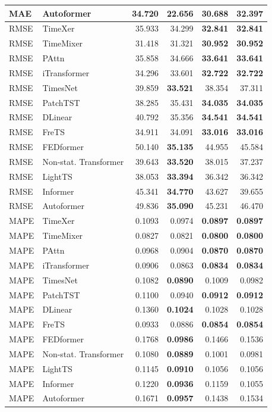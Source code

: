 \begin{longtable}{llrrrr}
MAE & Autoformer & 34.720 & \textbf{22.656} & 30.688 & 32.397 \\
\midrule
RMSE & TimeXer & 35.933 & 34.299 & \textbf{32.841} & \textbf{32.841} \\
RMSE & TimeMixer & 31.418 & 31.321 & \textbf{30.952} & \textbf{30.952} \\
RMSE & PAttn & 35.858 & 34.666 & \textbf{33.641} & \textbf{33.641} \\
RMSE & iTransformer & 34.296 & 33.601 & \textbf{32.722} & \textbf{32.722} \\
RMSE & TimesNet & 39.859 & \textbf{33.521} & 38.354 & 37.311 \\
RMSE & PatchTST & 38.285 & 35.431 & \textbf{34.035} & \textbf{34.035} \\
RMSE & DLinear & 40.792 & 35.356 & \textbf{34.541} & \textbf{34.541} \\
RMSE & FreTS & 34.911 & 34.091 & \textbf{33.016} & \textbf{33.016} \\
RMSE & FEDformer & 50.140 & \textbf{35.135} & 44.955 & 45.584 \\
RMSE & Non-stat. Transformer & 39.643 & \textbf{33.520} & 38.015 & 37.237 \\
RMSE & LightTS & 38.053 & \textbf{33.394} & 36.342 & 36.342 \\
RMSE & Informer & 45.341 & \textbf{34.770} & 43.627 & 39.655 \\
RMSE & Autoformer & 49.836 & \textbf{35.090} & 45.231 & 46.470 \\
\midrule
MAPE & TimeXer & 0.1093 & 0.0974 & \textbf{0.0897} & \textbf{0.0897} \\
MAPE & TimeMixer & 0.0827 & 0.0821 & \textbf{0.0800} & \textbf{0.0800} \\
MAPE & PAttn & 0.0968 & 0.0904 & \textbf{0.0870} & \textbf{0.0870} \\
MAPE & iTransformer & 0.0906 & 0.0863 & \textbf{0.0834} & \textbf{0.0834} \\
MAPE & TimesNet & 0.1082 & \textbf{0.0890} & 0.1009 & 0.0982 \\
MAPE & PatchTST & 0.1100 & 0.0940 & \textbf{0.0912} & \textbf{0.0912} \\
MAPE & DLinear & 0.1360 & \textbf{0.1024} & 0.1028 & 0.1028 \\
MAPE & FreTS & 0.0933 & 0.0886 & \textbf{0.0854} & \textbf{0.0854} \\
MAPE & FEDformer & 0.1768 & \textbf{0.0986} & 0.1466 & 0.1536 \\
MAPE & Non-stat. Transformer & 0.1080 & \textbf{0.0889} & 0.1001 & 0.0981 \\
MAPE & LightTS & 0.1145 & \textbf{0.0910} & 0.1056 & 0.1056 \\
MAPE & Informer & 0.1220 & \textbf{0.0936} & 0.1159 & 0.1055 \\
MAPE & Autoformer & 0.1671 & \textbf{0.0957} & 0.1438 & 0.1534 \\
\end{longtable}
\endgroup

